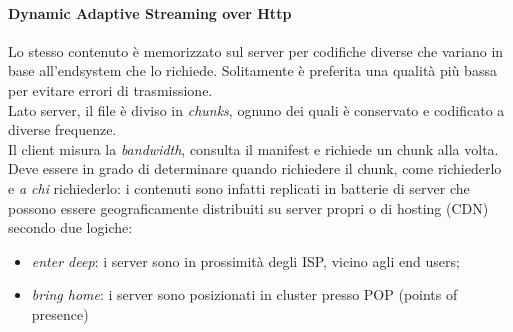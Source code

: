 \paragraph{Dynamic Adaptive Streaming over Http}
Lo stesso contenuto è memorizzato sul server per codifiche diverse che variano in base all'endsystem che lo richiede. Solitamente è preferita una qualità più bassa per evitare errori di trasmissione.\\
Lato server, il file è diviso in \textit{chunks}, ognuno dei quali è conservato e codificato a diverse frequenze.\\
Il client misura la \textit{bandwidth}, consulta il manifest e richiede un chunk alla volta. Deve essere in grado di determinare quando richiedere il chunk, come richiederlo e \textit{a chi} richiederlo: i contenuti sono infatti replicati in batterie di server che possono essere geograficamente distribuiti su server propri o di hosting (CDN) secondo due logiche:
\begin{itemize}
    \item \textit{enter deep}: i server sono in prossimità degli ISP, vicino agli end users;
    \item \textit{bring home}: i server sono posizionati in cluster presso POP (points of presence)
\end{itemize}

